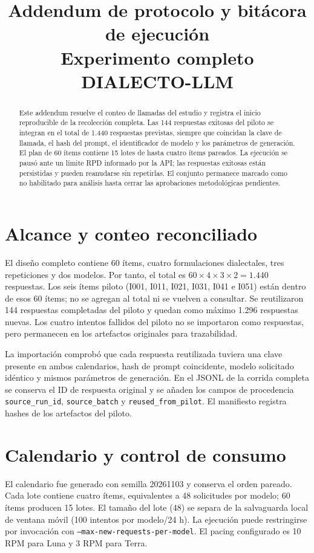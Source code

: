 \documentclass[conference]{IEEEtran}
\title{Addendum de protocolo y bitácora de ejecución\\Experimento completo DIALECTO-LLM}
\author{\IEEEauthorblockN{Grupo 3}\IEEEauthorblockA{Documento de trabajo\\12 de noviembre de 2026}}
\begin{document}
\maketitle
\begin{abstract}
Este addendum resuelve el conteo de llamadas del estudio y registra el inicio reproducible de la recolección completa. Las 144 respuestas exitosas del piloto se integran en el total de 1.440 respuestas previstas, siempre que coincidan la clave de llamada, el hash del prompt, el identificador de modelo y los parámetros de generación. El plan de 60 ítems contiene 15 lotes de hasta cuatro ítems pareados. La ejecución se pausó ante un límite RPD informado por la API; las respuestas exitosas están persistidas y pueden reanudarse sin repetirlas. El conjunto permanece marcado como no habilitado para análisis hasta cerrar las aprobaciones metodológicas pendientes.
\end{abstract}

\section{Alcance y conteo reconciliado}
El diseño completo contiene 60 ítems, cuatro formulaciones dialectales, tres repeticiones y dos modelos. Por tanto, el total es $60\times4\times3\times2=1.440$ respuestas. Los seis ítems piloto (I001, I011, I021, I031, I041 e I051) están dentro de esos 60 ítems; no se agregan al total ni se vuelven a consultar. Se reutilizaron 144 respuestas completadas del piloto y quedan como máximo 1.296 respuestas nuevas. Los cuatro intentos fallidos del piloto no se importaron como respuestas, pero permanecen en los artefactos originales para trazabilidad.

La importación comprobó que cada respuesta reutilizada tuviera una clave presente en ambos calendarios, hash de prompt coincidente, modelo solicitado idéntico y mismos parámetros de generación. En el JSONL de la corrida completa se conserva el ID de respuesta original y se añaden los campos de procedencia \texttt{source\_run\_id}, \texttt{source\_batch} y \texttt{reused\_from\_pilot}. El manifiesto registra hashes de los artefactos del piloto.

\section{Calendario y control de consumo}
El calendario fue generado con semilla 20261103 y conserva el orden pareado. Cada lote contiene cuatro ítems, equivalentes a 48 solicitudes por modelo; 60 ítems producen 15 lotes. El tamaño del lote (48) se separa de la salvaguarda local de ventana móvil (100 intentos por modelo/24 h). La ejecución puede restringirse por invocación con \texttt{--max-new-requests-per-model}. El pacing configurado es 10 RPM para Luna y 3 RPM para Terra.
\end{document}
